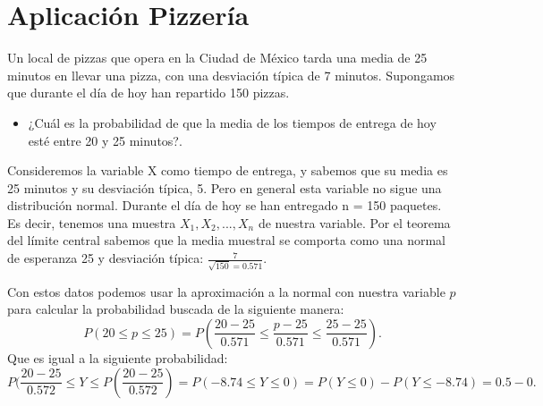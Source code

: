 \documentclass[]{article}
\begin{document}
\section{Aplicación Pizzería}
Un local de pizzas que opera en la Ciudad de México tarda una media de 25 minutos en llevar una pizza,
con una desviación típica de 7 minutos. Supongamos que durante el día de hoy han repartido 150
pizzas.
\begin{itemize}
	\item ¿Cuál es la probabilidad de que la media de los tiempos de entrega de hoy esté entre 20 y 25 minutos?.
\end{itemize}
Consideremos la variable X como tiempo de entrega, 
y sabemos que su media es 25 minutos y su
desviación típica, 5. Pero en general esta variable no sigue una distribución normal.
Durante el día de hoy se han entregado n = 150 paquetes. Es decir, tenemos una muestra $X_{1}, X_{2}, ..., X_{n}$ de nuestra
variable.
Por el teorema del límite central sabemos que la media muestral se comporta como una normal de
esperanza 25 y desviación típica:
$\frac{7}{\sqrt{150} = 0.571}.$

Con estos datos podemos usar la  aproximación a la normal con nuestra variable $p$ para calcular la probabilidad buscada de la siguiente manera:
\[ P(20 \leq p \leq 25) = P(\frac{20-25}{0.571} \leq \frac{p-25}{0.571} \leq \frac{25-25}{0.571}).\]
Que es igual a la siguiente probabilidad:
\[ P(\frac{20-25}{0.572} \leq Y \leq P(\frac{20-25}{0.572}) = P(-8.74 \leq Y \leq 0) = P(Y \leq 0) - P(Y \leq -8.74) = 0.5 - 0.\]

\printbibliography[title={Referencias}]
\end{document}
